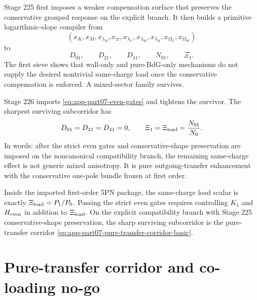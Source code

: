 Stage 225 first imposes a weaker compensation surface that preserves the conservative grouped response on the explicit branch.  It then builds a primitive logarithmic-slope compiler from
\begin{equation}
\label{eq:app-part07-primitive-log-slopes}
(x_K,x_M,x_{\lambda_B},x_{\varpi},x_{\lambda_U},x_{\lambda_W},x_{\lambda_R},x_{\Omega_U},x_{\Omega_W})
\end{equation}
to
\begin{equation}
\label{eq:app-part07-primitive-compiler-output}
D_{01},
\qquad
D_{21},
\qquad
D_{41},
\qquad
N_{01},
\qquad
\Xi_1.
\end{equation}
The first sieve shows that wall-only and pure-BdG-only mechanisms do not supply the desired nontrivial same-charge load once the conservative compensation is enforced.  A mixed-sector family survives.

Stage 226 imports \cref{eq:app-part07-even-gates} and tightens the survivor.  The sharpest surviving subcorridor has
\begin{equation}
\label{eq:app-part07-pure-transfer-corridor-basic}
D_{01}=D_{21}=D_{41}=0,
\qquad
\Xi_1=\Xi_{\rm load}=\frac{N_{01}}{N_0}.
\end{equation}
In words: after the strict even gates and conservative-shape preservation are imposed on the noncanonical compatibility branch, the remaining same-charge effect is not generic mixed anisotropy.  It is pure outgoing-transfer enhancement with the conservative one-pole bundle frozen at first order.

\begin{theorem}
\label{thm:app-part07-strict-even-package}
Inside the imported first-order 5PN package, the same-charge load scalar is exactly \(\Xi_{\rm load}=P_1/P_0\).  Passing the strict even gates requires controlling \(K_1\) and \(H_{\rm even}\) in addition to \(\Xi_{\rm load}\).  On the explicit compatibility branch with Stage 225 conservative-shape preservation, the sharp surviving subcorridor is the pure-transfer corridor \cref{eq:app-part07-pure-transfer-corridor-basic}.
\end{theorem}


\section{Pure-transfer corridor and co-loading no-go}
\label{sec:app-part07_same_charge_rigid_mouth:pure-transfer-corridor-and-co-loading-no-go}

